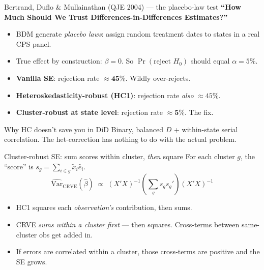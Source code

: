\documentclass[aspectratio=169,11pt]{beamer}
\begin{document}
\begin{frame}{Bertrand, Duflo \& Mullainathan (QJE 2004) --- the placebo-law test}
\vspace{0.4em}
\textbf{``How Much Should We Trust Differences-in-Differences Estimates?''}
\vspace{0.5em}
\begin{itemize}\small
  \item BDM generate \textit{placebo laws}: assign random treatment dates to states in a real CPS panel.
  \item True effect by construction: $\beta = 0$. So $\Pr(\text{reject } H_0)$ should equal $\alpha = 5\%$.
  \item \textbf{Vanilla SE}: rejection rate $\approx \mathbf{45\%}$. Wildly over-rejects.
  \item \textbf{Heteroskedasticity-robust (HC1)}: rejection rate \textit{also} $\approx 45\%$. 
  \item \textbf{Cluster-robust at state level}: rejection rate $\approx \mathbf{5\%}$. The fix.
\end{itemize}
\vspace{0.4em}
\begin{block}{Why HC doesn't save you in DiD}
\small
Binary, balanced $D$ + within-state serial correlation. The het-correction has nothing to do with the actual problem. 
\end{block}
\end{frame}

\begin{frame}{Cluster-robust SE: sum scores within cluster, \textit{then} square}
\vspace{0.5em}
For each cluster $g$, the ``score'' is $s_g = \sum_{i \in g} \tilde x_i \hat e_i$.
\vspace{0.4em}
\[
\widehat{\text{Var}}_{\text{CRVE}}(\hat\beta) \;\propto\; (X'X)^{-1}\!\left(\sum_g s_g s_g'\right)\!(X'X)^{-1}
\]
\vspace{0.2em}
\begin{itemize}
  \item HC1 squares each \textit{observation's} contribution, then sums.
  \item CRVE \textit{sums within a cluster first} --- then squares. Cross-terms between same-cluster obs get added in.
  \item If errors are correlated within a cluster, those cross-terms are positive and the SE grows.
\end{itemize}
\end{frame}
\end{document}
